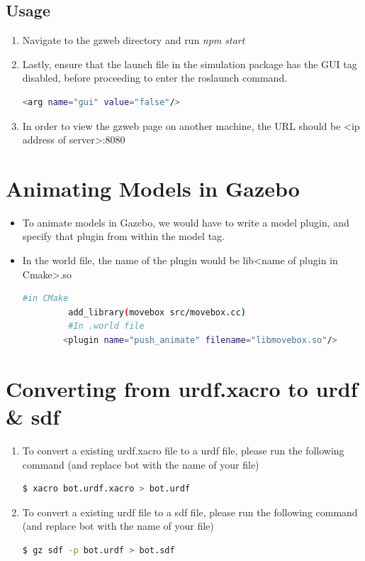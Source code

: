\documentclass[11pt]{article}
\begin{document}
\subsection{Usage}
\begin{enumerate}

 \item { Navigate to the gzweb directory and run \emph{npm start}}
 \item{
       Lastly, ensure that the launch file in the simulation package has the GUI tag disabled, before proceeding to enter the roslaunch command.
       \begin{lstlisting}[language=bash]
          <arg name="gui" value="false"/>
       \end{lstlisting}
       }
 \item{
       In order to view the gzweb page on another machine, the URL should be <ip address of server>:8080
       }
\end{enumerate}

\section{Animating Models in Gazebo}
\begin{itemize}
 \item {
       To animate models in Gazebo, we would have to write a model plugin, and specify that plugin from within the model tag.
       }
 \item {
       In the world file, the name of the plugin would be
       lib<name of plugin in Cmake>.so
       
       \begin{lstlisting}[language=bash]
         #in CMake
         add_library(movebox src/movebox.cc)
         #In .world file
        <plugin name="push_animate" filename="libmovebox.so"/>
       \end{lstlisting}
       
       }
\end{itemize}
\section{Converting from urdf.xacro to urdf \& sdf}
\label{sec:conversion}
\begin{enumerate}
 \item {
       To convert a existing urdf.xacro file to a urdf file, please run the following command (and replace
       bot with the name of your file)
       \begin{lstlisting}[language=bash]
$ xacro bot.urdf.xacro > bot.urdf
\end{lstlisting}
       }
 \item {
       To convert a existing urdf file to a sdf file, please run the following command (and replace
       bot with the name of your file)
       \begin{lstlisting}[language=bash]
$ gz sdf -p bot.urdf > bot.sdf
\end{lstlisting}
       }
       
\end{enumerate}
\end{document}
